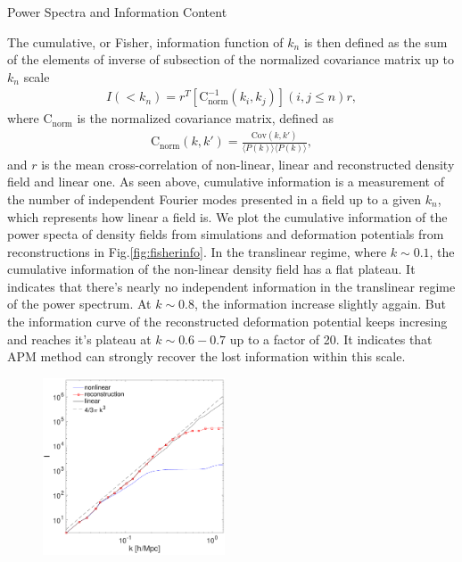 \begin{section}{Power Spectra and Information Content}
\begin{figure}
    \label{fig:corrall}
\end{figure}
    The cumulative, or Fisher, information function of $k_n$ is then defined as the sum of the 
elements of inverse of subsection of the normalized covariance matrix up to $k_n$ scale
\begin{align}
    I \left( < k_n\right) = r^T \left[ \mathrm{C^{-1}_{norm}} \left( k_i,k_j \right)\right] \left( i,j \leq n \right) r,
\end{align}
where $\mathrm{C_{norm}}$ is the normalized covariance matrix, defined as
\begin{align}
    \mathrm{C_{norm}} \left( k,k' \right)=\frac{\mathrm{Cov}(k,k')}{\langle P(k)\rangle\langle P(k)\rangle},
\end{align}
and $r$ is the mean cross-correlation of non-linear, linear and reconstructed density field and linear one.
As seen above, cumulative information is a measurement of the number of independent Fourier modes 
presented in a field up to a given $k_n$, which represents how linear a field is. We plot the 
cumulative information of the power specta of density fields from simulations and deformation 
potentials from reconstructions in Fig.\ref{fig:fisherinfo}. In the translinear regime, where 
$k\sim0.1$, the cumulative information of the non-linear density field has a flat plateau. It 
indicates that there's nearly no independent information in the translinear regime of the power 
spectrum. At $k\sim0.8$, the information increase slightly aggain. But the information curve of 
the reconstructed deformation potential keeps incresing and reaches it's plateau at $k\sim0.6-0.7$ 
up to a factor of 20. It indicates that APM method can strongly recover the lost information within this scale. 
\begin{figure}[t!]
 \begin{center}
  \includegraphics[width=0.48\textwidth]{fisher_1-crop.pdf}

\end{center}
\end{figure}
\end{section}
